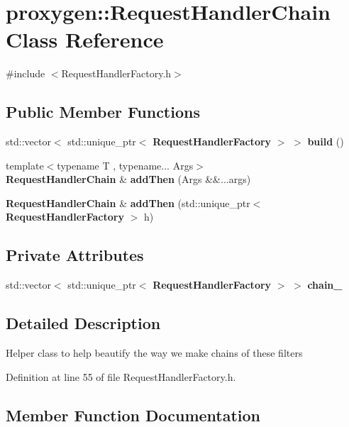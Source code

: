 \section{proxygen\+:\+:Request\+Handler\+Chain Class Reference}
\label{classproxygen_1_1RequestHandlerChain}


{\ttfamily \#include $<$Request\+Handler\+Factory.\+h$>$}

\subsection*{Public Member Functions}
\begin{DoxyCompactItemize}
\item 
std\+::vector$<$ std\+::unique\+\_\+ptr$<$ {\bf Request\+Handler\+Factory} $>$ $>$ {\bf build} ()
\item 
{\footnotesize template$<$typename T , typename... Args$>$ }\\{\bf Request\+Handler\+Chain} \& {\bf add\+Then} (Args \&\&...args)
\item 
{\bf Request\+Handler\+Chain} \& {\bf add\+Then} (std\+::unique\+\_\+ptr$<$ {\bf Request\+Handler\+Factory} $>$ h)
\end{DoxyCompactItemize}
\subsection*{Private Attributes}
\begin{DoxyCompactItemize}
\item 
std\+::vector$<$ std\+::unique\+\_\+ptr$<$ {\bf Request\+Handler\+Factory} $>$ $>$ {\bf chain\+\_\+}
\end{DoxyCompactItemize}


\subsection{Detailed Description}
Helper class to help beautify the way we make chains of these filters 

Definition at line 55 of file Request\+Handler\+Factory.\+h.



\subsection{Member Function Documentation}
